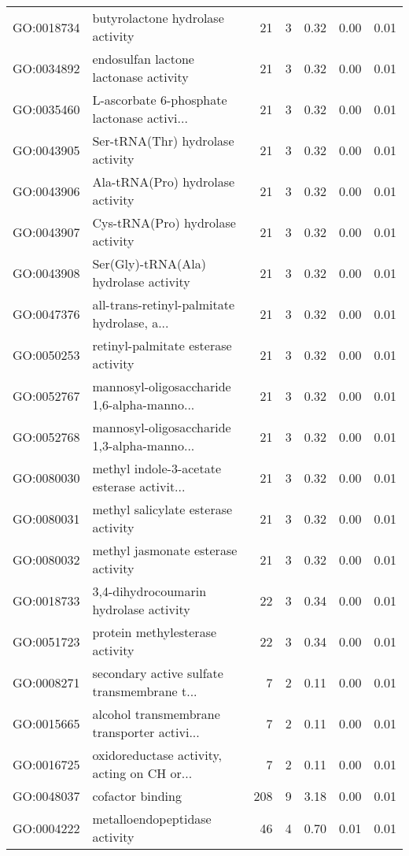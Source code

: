 \begin{table}[ht]
\begin{tabular}{llrrrrr}
  GO:0018734 & butyrolactone hydrolase activity &  21 &   3 & 0.32 & 0.00 & 0.01 \\ 
  GO:0034892 & endosulfan lactone lactonase activity &  21 &   3 & 0.32 & 0.00 & 0.01 \\ 
  GO:0035460 & L-ascorbate 6-phosphate lactonase activi... &  21 &   3 & 0.32 & 0.00 & 0.01 \\ 
  GO:0043905 & Ser-tRNA(Thr) hydrolase activity &  21 &   3 & 0.32 & 0.00 & 0.01 \\ 
  GO:0043906 & Ala-tRNA(Pro) hydrolase activity &  21 &   3 & 0.32 & 0.00 & 0.01 \\ 
  GO:0043907 & Cys-tRNA(Pro) hydrolase activity &  21 &   3 & 0.32 & 0.00 & 0.01 \\ 
  GO:0043908 & Ser(Gly)-tRNA(Ala) hydrolase activity &  21 &   3 & 0.32 & 0.00 & 0.01 \\ 
  GO:0047376 & all-trans-retinyl-palmitate hydrolase, a... &  21 &   3 & 0.32 & 0.00 & 0.01 \\ 
  GO:0050253 & retinyl-palmitate esterase activity &  21 &   3 & 0.32 & 0.00 & 0.01 \\ 
  GO:0052767 & mannosyl-oligosaccharide 1,6-alpha-manno... &  21 &   3 & 0.32 & 0.00 & 0.01 \\ 
  GO:0052768 & mannosyl-oligosaccharide 1,3-alpha-manno... &  21 &   3 & 0.32 & 0.00 & 0.01 \\ 
  GO:0080030 & methyl indole-3-acetate esterase activit... &  21 &   3 & 0.32 & 0.00 & 0.01 \\ 
  GO:0080031 & methyl salicylate esterase activity &  21 &   3 & 0.32 & 0.00 & 0.01 \\ 
  GO:0080032 & methyl jasmonate esterase activity &  21 &   3 & 0.32 & 0.00 & 0.01 \\ 
  GO:0018733 & 3,4-dihydrocoumarin hydrolase activity &  22 &   3 & 0.34 & 0.00 & 0.01 \\ 
  GO:0051723 & protein methylesterase activity &  22 &   3 & 0.34 & 0.00 & 0.01 \\ 
  GO:0008271 & secondary active sulfate transmembrane t... &   7 &   2 & 0.11 & 0.00 & 0.01 \\ 
  GO:0015665 & alcohol transmembrane transporter activi... &   7 &   2 & 0.11 & 0.00 & 0.01 \\ 
  GO:0016725 & oxidoreductase activity, acting on CH or... &   7 &   2 & 0.11 & 0.00 & 0.01 \\ 
  GO:0048037 & cofactor binding & 208 &   9 & 3.18 & 0.00 & 0.01 \\ 
  GO:0004222 & metalloendopeptidase activity &  46 &   4 & 0.70 & 0.01 & 0.01 \\ 

\end{tabular}
\end{table}
